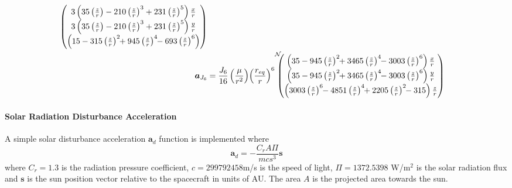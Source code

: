 \begin{align}
{\begin{pmatrix}
		3\left(35\left(\frac{z}{r}\right) - 210 
		\left(\frac{z}{r}\right)^{3} +231 \left(\frac{z}{r}\right)^{5}
		\right) \frac{x}{r} \\
		3\left(35\left(\frac{z}{r}\right) - 210 
		\left(\frac{z}{r}\right)^{3} +231 \left(\frac{z}{r}\right)^{5}
		\right) \frac{y}{r} \\
		\left(15- 315\left(\frac{z}{r}\right)^{2} \!\!+ 945 
		\left( \frac{z}{r}\right)^{4}\!\! -693 \left(\frac{z}{r}\right)^{6} 
		\right) 
	\end{pmatrix}}
	\label{eq:gm:aJ5}
	\\
	\bm a_{J_{6}} &=  \frac{J_{6}}{16}  
	\left(\frac{\mu}{r^{2}}\right)\!
	\left( \frac{r_{eq}}{r}\right)^{6}\!
	\leftexp{N\!\!\!}{
	\begin{pmatrix}
		\left(35 - 945 \left(\frac{z}{r}\right)^{2} \!\!
		+ 3465 \left(\frac{z}{r}\right)^{4} \!\!
		- 3003 \left(\frac{z}{r}\right)^{6} 
		\right) \frac{x}{r} \\
		\left(35 - 945 \left(\frac{z}{r}\right)^{2} \!\!
		+ 3465 \left(\frac{z}{r}\right)^{4} \!\!
		- 3003 \left(\frac{z}{r}\right)^{6}  
		\right) \frac{y}{r} \\
		\left( 3003 \left(\frac{z}{r}\right)^{6} \!\!
		-4851 \left(\frac{z}{r}\right)^{4}\!\!
		+ 2205 \left(\frac{z}{r}\right)^{2}\!\!
		- 315
		\right) \frac{z}{r}
	\end{pmatrix}}
	\label{eq:gm:aJ6}
\end{align}

\paragraph{Solar Radiation Disturbance Acceleration}
A simple solar disturbance acceleration $\bm a_{d}$ function is implemented where
\begin{equation}
	\bm a_{d} = - \frac{C_{r} A \Pi}{m c s^{3}} \bm s
\end{equation}
where $C_{r} = 1.3$ is the radiation pressure coefficient,  $c = 299792458$m/s is the speed of light, $\Pi = 1372.5398$ W/m$^{2}$ is the solar radiation flux and $\bm s$ is the sun position vector relative to the spacecraft in units of AU.  The area $A$ is the projected area towards the sun.



